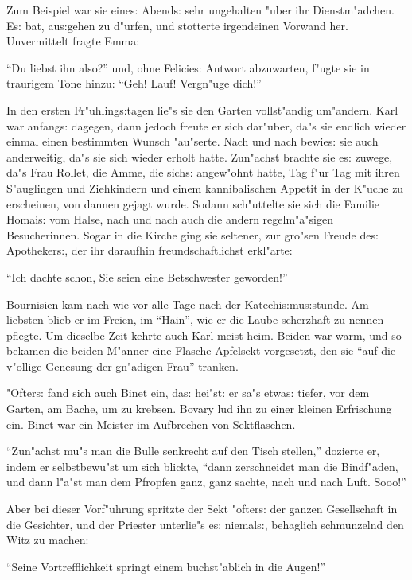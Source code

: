 \documentclass[oneside,12pt]{book}
\newcommand{\s}{s:}%
\begin{document}
Zum Beispiel war sie eine{\s} Abend{\s} sehr ungehalten "uber ihr
Dienst\-m"ad\-chen. E{\s} bat, au{\s}gehen zu d"urfen, und
stotterte irgendeinen Vorwand her. Un\-vermittelt fragte Emma:

"`Du liebst ihn also?"' und, ohne Felicie{\s} Antwort abzuwarten,
f"ugte sie in traurigem Tone hinzu: "`Geh! Lauf! Vergn"uge dich!"'

In den ersten Fr"uhling{\s}tagen lie"s sie den Garten vollst"andig
um"andern. Karl war anfang{\s} dagegen, dann jedoch freute er sich
dar"uber, da"s sie endlich wieder einmal einen bestimmten Wunsch
"au"serte. Nach und nach bewie{\s} sie auch anderweitig, da"s sie
sich wieder erholt hatte. Zun"achst brachte sie e{\s} zuwege, da"s
Frau Rollet, die Amme, die sich{\s} angew"ohnt hatte, Tag f"ur Tag
mit ihren S"auglingen und Ziehkindern und einem kannibalischen
Appetit in der K"uche zu erscheinen, von dannen gejagt wurde.
Sodann sch"uttelte sie sich die Familie Homai{\s} vom Halse, nach
und nach auch die andern regelm"a"sigen Besucherinnen. Sogar in
die Kirche ging sie seltener, zur gro"sen Freude de{\s}
Apotheker{\s}, der ihr daraufhin freundschaftlichst erkl"arte:

"`Ich dachte schon, Sie seien eine Betschwester geworden!"'

Bournisien kam nach wie vor alle Tage nach der
Katechi{\s}mu{\s}stunde. Am liebsten blieb er im Freien, im
"`Hain"', wie er die Laube scherzhaft zu nennen pflegte. Um
dieselbe Zeit kehrte auch Karl meist heim. Beiden war warm, und so
bekamen die beiden M"anner eine Flasche Apfelsekt vorgesetzt, den
sie "`auf die v"ollige Genesung der gn"adigen Frau"' tranken.

"Ofter{\s} fand sich auch Binet ein, da{\s} hei"st: er sa"s
etwa{\s} tiefer, vor dem Garten, am Bache, um zu krebsen. Bovary
lud ihn zu einer kleinen Erfrischung ein. Binet war ein Meister im
Aufbrechen von Sektflaschen.

"`Zun"achst mu"s man die Bulle senkrecht auf den Tisch stellen,"'
dozierte er, indem er selbstbewu"st um sich blickte, "`dann
zerschneidet man die Bindf"aden, und dann l"a"st man dem Pfropfen
ganz, ganz sachte, nach und nach Luft. Sooo!"'

Aber bei dieser Vorf"uhrung spritzte der Sekt "ofter{\s} der
ganzen Gesellschaft in die Gesichter, und der Priester unterlie"s
e{\s} niemal{\s}, behaglich schmunzelnd den Witz zu machen:

"`Seine Vortrefflichkeit springt einem buchst"ablich in die Augen!"'
\end{document}
